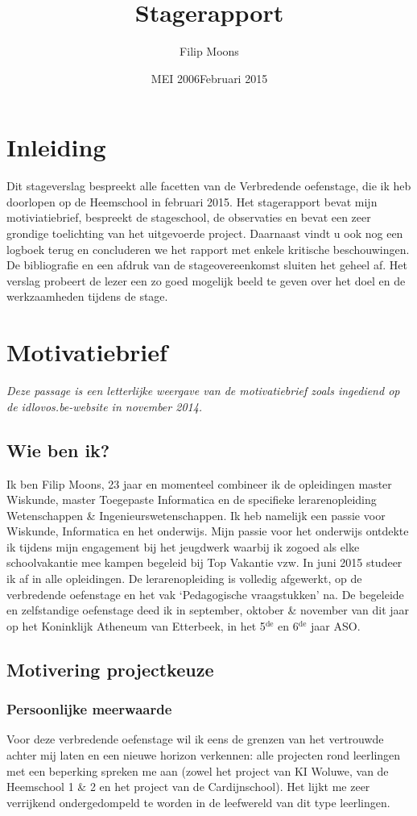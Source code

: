 \documentclass[a4paper,11pt]{article}
\author{Filip Moons}
\title{Stagerapport}
\date{MEI 2006}
\date{Februari 2015}
\theoremstyle{definition}
\begin{document}
\maketitlepage


\tableofcontents
\newpage
\section{Inleiding}
Dit stageverslag bespreekt alle facetten van de Verbredende oefenstage, die ik heb doorlopen op de Heemschool in februari 2015. 
Het stagerapport bevat mijn motiviatiebrief, bespreekt de stageschool, de observaties en bevat een zeer grondige toelichting van het uitgevoerde project. 
Daarnaast vindt u ook nog een logboek terug en concluderen we het rapport met enkele kritische beschouwingen. De bibliografie en een afdruk
van de stageovereenkomst sluiten het geheel af. Het verslag 
probeert de lezer een zo goed mogelijk beeld te geven over het doel en de 
werkzaamheden tijdens de stage.
\newpage
\section{Motivatiebrief}
\emph{Deze passage is een letterlijke weergave van de motivatiebrief zoals ingediend op de idlovos.be-website in november 2014.}
\subsection{Wie ben ik?}
Ik ben Filip Moons, 23 jaar en momenteel combineer ik de opleidingen master Wiskunde, master Toegepaste Informatica
en de specifieke lerarenopleiding Wetenschappen \& Ingenieurswetenschappen. Ik heb namelijk een passie voor
Wiskunde, Informatica en het onderwijs. Mijn passie voor het onderwijs ontdekte ik tijdens mijn engagement bij het jeugdwerk waarbij ik zogoed als
elke schoolvakantie mee  kampen begeleid bij Top Vakantie vzw. In juni 2015 studeer ik af in alle opleidingen. De lerarenopleiding is volledig 
afgewerkt, op de verbredende oefenstage en het vak `Pedagogische vraagstukken' 
na. De begeleide en zelfstandige oefenstage deed ik in september, oktober \& 
november van dit jaar op het Koninklijk Atheneum van Etterbeek, in het 5$^\text{de}$ en 6$^\text{de}$ 
jaar ASO.

\subsection{Motivering projectkeuze}
\subsubsection{Persoonlijke meerwaarde}
Voor deze verbredende oefenstage wil ik eens de grenzen van het vertrouwde achter mij laten
en een nieuwe horizon verkennen: alle projecten rond leerlingen met een beperking spreken me aan (zowel het 
project van KI Woluwe, van de Heemschool 1 \& 2 en het project van de Cardijnschool). 
Het lijkt me zeer verrijkend ondergedompeld te worden in de leefwereld van dit type 
leerlingen.\\
\end{document}
